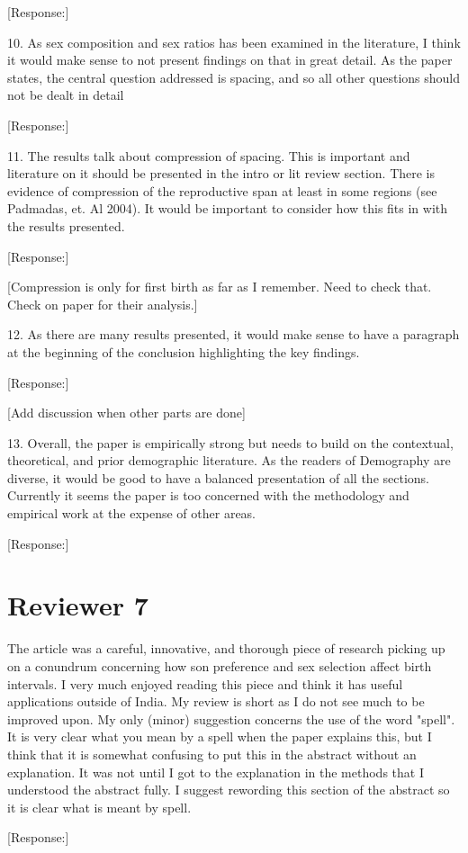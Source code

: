 \documentclass[letterpaper,12pt]{article}
\begin{document}
[Response:]

10. As sex composition and sex ratios has been examined in the literature, I think
it would make sense to not present findings on that in great detail. As
the paper states, the central question addressed is spacing, and so all
other questions should not be dealt in detail

[Response:]

11. The results talk about compression of spacing. This is important and
literature on it should be presented in the intro or lit review section.
There is evidence of compression of the reproductive span at least in
some regions (see Padmadas, et. Al 2004). It would be important to
consider how this fits in with the results presented.

[Response:]

[Compression is only for first birth as far as I remember. Need to check that.
Check on paper for their analysis.]


12. As there are many results presented, it would make sense to have a
paragraph at the beginning of the conclusion highlighting the key
findings.

[Response:]

[Add discussion when other parts are done]

13. Overall, the paper is empirically strong but needs to build on the
contextual, theoretical, and prior demographic literature. As the
readers of Demography are diverse, it would be good to have a balanced
presentation of all the sections. Currently it seems the paper is too
concerned with the methodology and empirical work at the expense of
other areas.

[Response:]

\newpage

\section*{Reviewer 7}

The article was a careful, innovative, and thorough piece of research
picking up on a conundrum concerning how son preference and sex
selection affect birth intervals. I very much enjoyed reading this piece
and think it has useful applications outside of India.  My review is
short as I do not see much to be improved upon.  My only (minor)
suggestion concerns the use of the word "spell".  It is very clear what
you mean by a spell when the paper explains this, but I think that it is
somewhat confusing to put this in the abstract without an explanation. 
It was not until I got to the explanation in the methods that I
understood the abstract fully.  I suggest rewording this section of the
abstract so it is clear what is meant by spell.

[Response:]



\newpage


\end{document}
